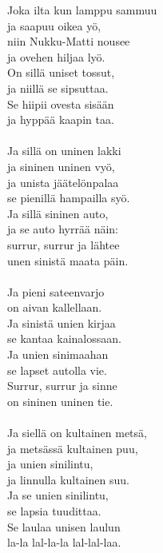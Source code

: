 
Joka ilta kun lamppu sammuu \\ ja saapuu oikea yö, \\ niin Nukku-Matti nousee \\ ja ovehen hiljaa lyö. \\ On sillä uniset tossut, \\ ja niillä se sipsuttaa. \\ Se hiipii ovesta sisään \\ ja hyppää kaapin taa. \\ \hspace{10mm} \\ Ja sillä on uninen lakki \\ ja sininen uninen vyö, \\ ja unista jäätelönpalaa \\ se pienillä hampailla syö. \\ Ja sillä sininen auto, \\ ja se auto hyrrää näin: \\ surrur, surrur ja lähtee \\ unen sinistä maata päin. \\ \hspace{10mm} \\ Ja pieni sateenvarjo \\ on aivan kallellaan. \\ Ja sinistä unien kirjaa \\ se kantaa kainalossaan. \\ Ja unien sinimaahan \\ se lapset autolla vie. \\ Surrur, surrur ja sinne \\ on sininen uninen tie. \\ \hspace{10mm} \\ Ja siellä on kultainen metsä, \\ ja metsässä kultainen puu, \\ ja unien sinilintu, \\ ja linnulla kultainen suu. \\ Ja se unien sinilintu, \\ se lapsia tuudittaa. \\ Se laulaa unisen laulun \\ la-la lal-la-la lal-lal-laa.